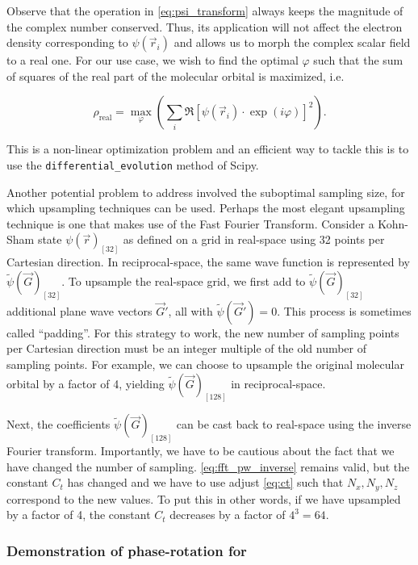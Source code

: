 Observe that the operation in \cref{eq:psi_transform} always keeps the magnitude of the complex number conserved. Thus, its application will not affect the electron density corresponding to $\psi(\vec{r}_{i})$ and allows us to morph the complex scalar field to a real one. For our use case, we wish to find the optimal $\varphi$ such that the sum of squares of the real part of the molecular orbital is maximized, i.e.

\begin{equation}
    \rho_{\text{real}} = \max_\varphi \left(\sum_{i}\mathfrak{R}\left[ \psi(\vec{r}_{i}) \cdot \exp \left(i \varphi \right)\right]^{2} \right).
    \label{eq:optimize_real}
\end{equation}

This is a non-linear optimization problem and an efficient way to tackle this is to use the \texttt{differential\_evolution} method of Scipy.\cite{differential_evolution}

Another potential problem to address involved the suboptimal sampling size, for which upsampling techniques can be used. Perhaps the most elegant upsampling technique is one that makes use of the Fast Fourier Transform. Consider a Kohn-Sham state $\psi(\vec{r})_{[32]}$ as defined on a grid in real-space using 32 points per Cartesian direction. In reciprocal-space, the same wave function is represented by $\tilde{\psi}(\vec{G})_{[32]}$. To upsample the real-space grid, we first add to $\tilde{\psi}(\vec{G})_{[32]}$ additional plane wave vectors $\vec{G}\prime$, all with $\tilde{\psi}(\vec{G}\prime) = 0$. This process is sometimes called ``padding''. For this strategy to work, the new number of sampling points per Cartesian direction must be an integer multiple of the old number of sampling points. For example, we can choose to upsample the original molecular orbital by a factor of 4, yielding $\tilde{\psi}(\vec{G})_{[128]}$ in reciprocal-space.

Next, the coefficients $\tilde{\psi}(\vec{G})_{[128]}$ can be cast back to real-space using the inverse Fourier transform. Importantly, we have to be cautious about the fact that we have changed the number of sampling. \cref{eq:fft_pw_inverse} remains valid, but the constant $C_{t}$ has changed and we have to use adjust \cref{eq:ct} such that $N_{x},N_{y},N_{z}$ correspond to the new values. To put this in other words, if we have upsampled by a factor of 4, the constant $C_{t}$ decreases by a factor of $4^{3}=64$.

%
%
%
\subsubsection{Demonstration of phase-rotation for }



